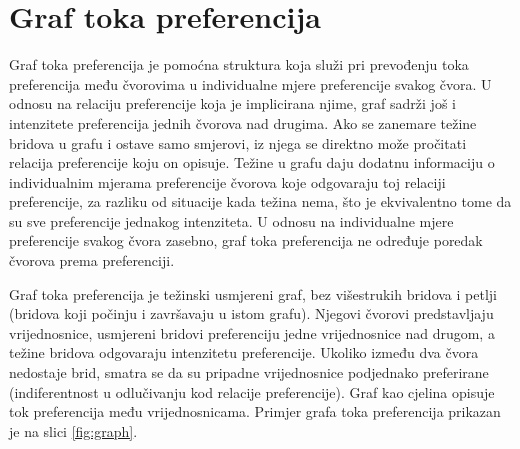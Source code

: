 \documentclass[lmodern, utf8, diplomski, numeric]{fer}
\begin{document}
  \section{Graf toka preferencija}
  Graf toka preferencija je pomoćna struktura koja služi pri prevođenju toka preferencija među čvorovima u individualne mjere preferencije svakog čvora.
  U odnosu na relaciju preferencije koja je implicirana njime, graf sadrži još i intenzitete preferencija jednih čvorova nad drugima.
  Ako se zanemare težine bridova u grafu i ostave samo smjerovi, iz njega se direktno može pročitati relacija preferencije koju on opisuje.
  Težine u grafu daju dodatnu informaciju o individualnim mjerama preferencije čvorova koje odgovaraju toj relaciji preferencije, za razliku od situacije kada težina nema, što je ekvivalentno tome da su sve preferencije jednakog intenziteta.
  U odnosu na individualne mjere preferencije svakog čvora zasebno, graf toka preferencija ne određuje poredak čvorova prema preferenciji.
  
  
  Graf toka preferencija je težinski usmjereni graf, bez višestrukih bridova i petlji (bridova koji počinju i završavaju u istom grafu).
  Njegovi čvorovi predstavljaju vrijednosnice, usmjereni bridovi preferenciju jedne vrijednosnice nad drugom, a težine bridova odgovaraju intenzitetu preferencije.
  Ukoliko između dva čvora nedostaje brid, smatra se da su pripadne vrijednosnice podjednako preferirane (indiferentnost u odlučivanju kod relacije preferencije).
  Graf kao cjelina opisuje tok preferencija među vrijednosnicama.
  Primjer grafa toka preferencija prikazan je na slici \ref{fig:graph}.
  
\end{document}
